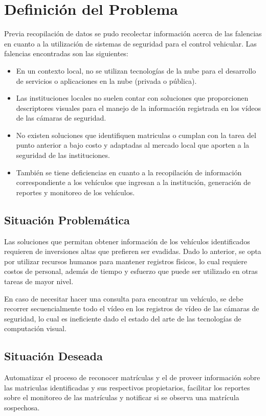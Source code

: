 \section{Definición del Problema}
Previa recopilación de datos se pudo recolectar información acerca de las falencias en cuanto a la utilización de sistemas de seguridad para el control vehicular. Las falencias encontradas son las siguientes:
\begin{itemize}
  \item En un contexto local, no se utilizan tecnologías de la nube para el desarrollo de servicios o aplicaciones en la nube (privada o pública). 
  \item Las instituciones locales no suelen contar con soluciones que proporcionen descriptores visuales para el manejo de la información registrada en los vídeos de las cámaras de seguridad. 
  \item No existen soluciones que identifiquen matriculas o cumplan con la tarea del punto anterior a bajo costo y adaptadas al mercado local que aporten a la seguridad de las instituciones.
  \item También se tiene deficiencias en cuanto a la recopilación de información correspondiente a los vehículos que ingresan a la institución, generación de reportes y monitoreo de los vehículos.
\end{itemize}

    \subsection{Situación Problemática}
    Las soluciones que permitan obtener información de los vehículos identificados requieren de inversiones altas que prefieren ser evadidas. Dado lo anterior, se opta por utilizar recursos humanos para mantener registros físicos, lo cual requiere costos de personal, además de tiempo y esfuerzo que puede ser utilizado en otras tareas de mayor nivel.
    
    En caso de necesitar hacer una consulta para encontrar un vehículo, se debe recorrer secuencialmente todo el vídeo en los registros de vídeo de las cámaras de seguridad, lo cual es ineficiente dado el estado del arte de las tecnologías de computación visual.
    \subsection{Situación Deseada}
    Automatizar el proceso de reconocer matrículas y el de proveer información sobre las matriculas identificadas y sus respectivos propietarios, facilitar los reportes sobre el monitoreo de las matrículas y notificar si se observa una matrícula sospechosa.
